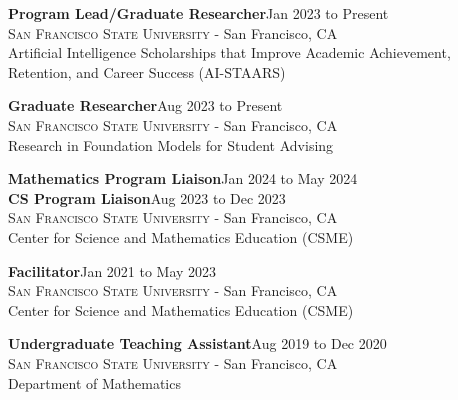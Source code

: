 \documentclass[hidelinks, 10pt]{article}
\def\contentspacing{2.5mm}          %
\def\sectiontocontentspacing{4mm}   %
\begin{document}
{\vspace{\sectiontocontentspacing}

\begin{minipage}[ct]{0.9\linewidth}
    \textbf{Program Lead/Graduate Researcher}\hfill Jan 2023 to Present\\
    {\textsc{San Francisco State University} - San Francisco, CA}\\
    Artificial Intelligence Scholarships that Improve Academic Achievement, Retention, and Career Success (AI-STAARS)
\end{minipage}

\vspace{\contentspacing}

\begin{minipage}[ct]{0.9\linewidth}
    \textbf{Graduate Researcher}\hfill Aug 2023 to Present\\
    {\textsc{San Francisco State University} - San Francisco, CA}\\
    Research in Foundation Models for Student Advising
\end{minipage}

\vspace{\contentspacing}

\begin{minipage}[ct]{0.9\linewidth}
    \textbf{Mathematics Program Liaison}\hfill Jan 2024 to May 2024\\
    \textbf{CS Program Liaison}\hfill Aug 2023 to Dec 2023\\
    {\textsc{San Francisco State University} - San Francisco, CA}\\
    Center for Science and Mathematics Education (CSME)
\end{minipage}

\vspace{\contentspacing}

\begin{minipage}[ct]{0.9\linewidth}
    \textbf{Facilitator}\hfill Jan 2021 to May 2023\\
    {\textsc{San Francisco State University} - San Francisco, CA}\\
    Center for Science and Mathematics Education (CSME)
\end{minipage}

\vspace{\contentspacing}

\begin{minipage}[ct]{0.9\linewidth}
    \textbf{Undergraduate Teaching Assistant}\hfill Aug 2019 to Dec 2020\\
    {\textsc{San Francisco State University} - San Francisco, CA}\\
    Department of Mathematics
\end{minipage}

}
\end{document}
